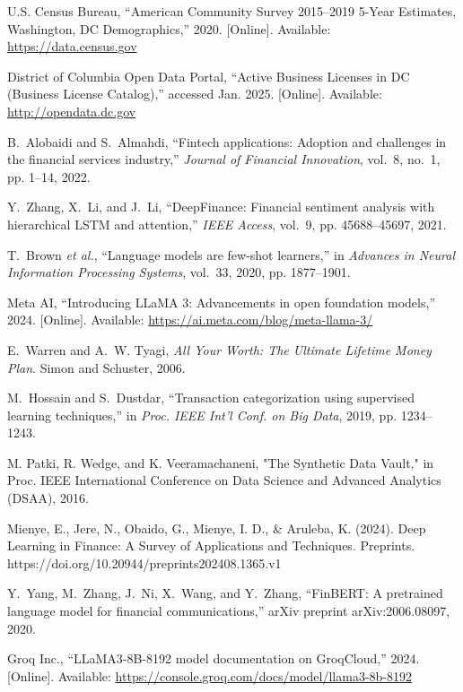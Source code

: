\documentclass[conference]{IEEEtran}
\begin{document}
\begin{thebibliography}{00}
U.S. Census Bureau, ``American Community Survey 2015--2019 5-Year Estimates, Washington, DC Demographics,'' 2020. [Online]. Available: \url{https://data.census.gov}

District of Columbia Open Data Portal, ``Active Business Licenses in DC (Business License Catalog),'' accessed Jan. 2025. [Online]. Available: \url{http://opendata.dc.gov}

B.~Alobaidi and S.~Almahdi, ``Fintech applications: Adoption and challenges in the financial services industry,'' \emph{Journal of Financial Innovation}, vol.~8, no.~1, pp. 1--14, 2022.

Y.~Zhang, X.~Li, and J.~Li, ``DeepFinance: Financial sentiment analysis with hierarchical LSTM and attention,'' \emph{IEEE Access}, vol.~9, pp. 45688--45697, 2021.

T.~Brown \emph{et al.}, ``Language models are few-shot learners,'' in \emph{Advances in Neural Information Processing Systems}, vol.~33, 2020, pp. 1877--1901.

Meta AI, ``Introducing LLaMA 3: Advancements in open foundation models,'' 2024. [Online]. Available: \url{https://ai.meta.com/blog/meta-llama-3/}

E.~Warren and A.~W. Tyagi, \emph{All Your Worth: The Ultimate Lifetime Money Plan}. Simon and Schuster, 2006.

M.~Hossain and S.~Dustdar, ``Transaction categorization using supervised learning techniques,'' in \emph{Proc. IEEE Int’l Conf. on Big Data}, 2019, pp. 1234--1243.

M. Patki, R. Wedge, and K. Veeramachaneni, "The Synthetic Data Vault," in Proc. IEEE International Conference on Data Science and Advanced Analytics (DSAA), 2016.

Mienye, E., Jere, N., Obaido, G., Mienye, I. D., & Aruleba, K. (2024). Deep Learning in Finance: A Survey of Applications and Techniques. Preprints. https://doi.org/10.20944/preprints202408.1365.v1

Y.~Yang, M.~Zhang, J.~Ni, X.~Wang, and Y.~Zhang, ``FinBERT: A pretrained language model for financial communications,'' arXiv preprint arXiv:2006.08097, 2020.

Groq Inc., ``LLaMA3-8B-8192 model documentation on GroqCloud,'' 2024. [Online]. Available: \url{https://console.groq.com/docs/model/llama3-8b-8192}


\end{thebibliography}
\end{document}
